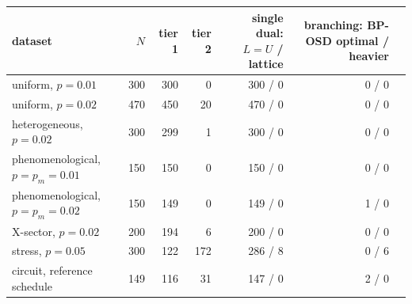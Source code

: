 \begin{tabular}{@{}lrrrrrr@{}}
\toprule
dataset & $N$ & tier 1 & tier 2 & single dual: $L=U$ / lattice & branching: BP-OSD optimal / heavier \\
\midrule
uniform, $p=0.01$ & 300 & 300 & 0 & 300 / 0 & 0 / 0 \\
uniform, $p=0.02$ & 470 & 450 & 20 & 470 / 0 & 0 / 0 \\
heterogeneous, $p=0.02$ & 300 & 299 & 1 & 300 / 0 & 0 / 0 \\
phenomenological, $p=p_m=0.01$ & 150 & 150 & 0 & 150 / 0 & 0 / 0 \\
phenomenological, $p=p_m=0.02$ & 150 & 149 & 0 & 149 / 0 & 1 / 0 \\
X-sector, $p=0.02$ & 200 & 194 & 6 & 200 / 0 & 0 / 0 \\
stress, $p=0.05$ & 300 & 122 & 172 & 286 / 8 & 0 / 6 \\
circuit, reference schedule & 149 & 116 & 31 & 147 / 0 & 2 / 0 \\
\bottomrule
\end{tabular}
